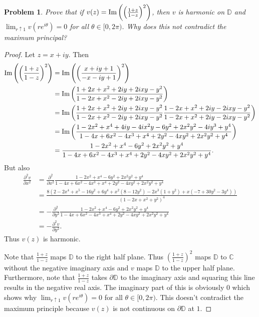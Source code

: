 \documentclass{article}
\newtheorem{problem}{Problem}
\begin{document}
\begin{problem}
Prove that if $v(z) = \textup{Im} \left ( \left ( \frac{1+z}{1-z} \right )^2 \right )$, then $v$ is harmonic on $\mathbb{D}$ and $\lim_{r \uparrow 1} v(re^{i \theta}) = 0$ for all $\theta \in [0, 2 \pi)$. Why does this not contradict the maximum principal?
\end{problem}
\begin{proof}
Let $z = x+ iy$. Then
\begin{align*}
\textup{Im} \left ( \left ( \frac{1+z}{1-z} \right )^2 \right )
&= \textup{Im} \left ( \left ( \frac{x+iy+1}{-x-iy+1} \right )^2 \right )\\
&= \textup{Im} \left ( \frac{1 + 2x + x^2 + 2iy + 2ixy - y^2}{1 - 2x + x^2 - 2iy + 2ixy - y^2} \right )\\
&= \textup{Im} \left ( \frac{1 + 2x + x^2 + 2iy + 2ixy - y^2}{1 - 2x + x^2 - 2iy + 2ixy - y^2} \frac{1 - 2x + x^2 + 2iy - 2ixy - y^2}{1 - 2x + x^2 + 2iy - 2ixy - y^2} \right )\\
&= \textup{Im} \left ( \frac{1 - 2x^2 + x^4 + 4iy - 4ix^2y - 6y^2 + 2x^2y^2 - 4iy^3 + y^4}{1 - 4x + 6x^2 - 4x^3 + x^4 + 2y^2 - 4xy^2 + 2x^2y^2 + y^4} \right )\\
&= \frac{1 - 2x^2 + x^4 - 6y^2 + 2x^2y^2 + y^4}{1 - 4x + 6x^2 - 4x^3 + x^4 + 2y^2 - 4xy^2 + 2x^2y^2 + y^4}.
\end{align*}
But also
\begin{align*}
\frac{\partial^2v}{\partial x^2}
&=\frac{\partial^2}{\partial x^2} \frac{1 - 2x^2 + x^4 - 6y^2 + 2x^2y^2 + y^4}{1 - 4x + 6x^2 - 4x^3 + x^4 + 2y^2 - 4xy^2 + 2x^2y^2 + y^4}\\
&= \frac{8(2 - 2x^4 + x^5 - 16y^2 + 6y^4 + x^2(8 - 12y^2) - 2x^3 (1 + y^2) + x(-7 + 30y^2 - 3y^4))}{(1 - 2x + x^2 + y^2)^4}\\
&= -\frac{\partial^2}{\partial y^2} \frac{1 - 2x^2 + x^4 - 6y^2 + 2x^2y^2 + y^4}{1 - 4x + 6x^2 - 4x^3 + x^4 + 2y^2 - 4xy^2 + 2x^2y^2 + y^4}\\
&= -\frac{\partial^2v}{\partial y^2}.
\end{align*}
Thus $v(z)$ is harmonic.

Note that $\frac{1+z}{1-z}$ maps $\mathbb{D}$ to the right half plane. Thus $\left (\frac{1+z}{1-z} \right )^2$ maps $\mathbb{D}$ to $\mathbb{C}$ without the negative imaginary axis and $v$ maps $\mathbb{D}$ to the upper half plane. Furthermore, note that $\frac{1+z}{1-z}$ takes $\partial \mathbb{D}$ to the imaginary axis and squaring this line results in the negative real axis. The imaginary part of this is obviously $0$ which shows why $\lim_{r \uparrow 1} v(re^{i \theta}) = 0$ for all $\theta \in [0, 2 \pi)$. This doesn't contradict the maximum principle because $v(z)$ is not continuous on $\partial \mathbb{D}$ at $1$.
\end{proof}
\end{document}
